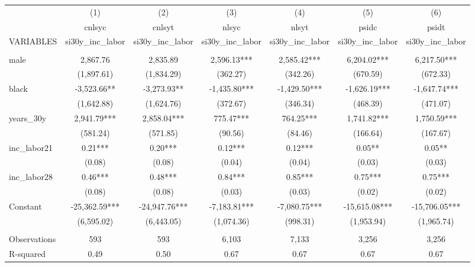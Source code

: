 \begin{tabular}{lcccccc} \hline
 & (1) & (2) & (3) & (4) & (5) & (6) \\
 & cnlsyc & cnlsyt & nlsyc & nlsyt & psidc & psidt \\
VARIABLES & si30y\_inc\_labor & si30y\_inc\_labor & si30y\_inc\_labor & si30y\_inc\_labor & si30y\_inc\_labor & si30y\_inc\_labor \\ \hline
 &  &  &  &  &  &  \\
male & 2,867.76 & 2,835.89 & 2,596.13*** & 2,585.42*** & 6,204.02*** & 6,217.50*** \\
 & (1,897.61) & (1,834.29) & (362.27) & (342.26) & (670.59) & (672.33) \\
black & -3,523.66** & -3,273.93** & -1,435.80*** & -1,429.50*** & -1,626.19*** & -1,647.74*** \\
 & (1,642.88) & (1,624.76) & (372.67) & (346.34) & (468.39) & (471.07) \\
years\_30y & 2,941.79*** & 2,858.04*** & 775.47*** & 764.25*** & 1,741.82*** & 1,750.59*** \\
 & (581.24) & (571.85) & (90.56) & (84.46) & (166.64) & (167.67) \\
inc\_labor21 & 0.21*** & 0.20*** & 0.12*** & 0.12*** & 0.05** & 0.05** \\
 & (0.08) & (0.08) & (0.04) & (0.04) & (0.03) & (0.03) \\
inc\_labor28 & 0.46*** & 0.48*** & 0.84*** & 0.85*** & 0.75*** & 0.75*** \\
 & (0.08) & (0.08) & (0.03) & (0.03) & (0.02) & (0.02) \\
Constant & -25,362.59*** & -24,947.76*** & -7,183.81*** & -7,080.75*** & -15,615.08*** & -15,706.05*** \\
 & (6,595.02) & (6,443.05) & (1,074.36) & (998.31) & (1,953.94) & (1,965.74) \\
 &  &  &  &  &  &  \\
Observations & 593 & 593 & 6,103 & 7,133 & 3,256 & 3,256 \\
 R-squared & 0.49 & 0.50 & 0.67 & 0.67 & 0.67 & 0.67 \\ \hline
\end{tabular}
